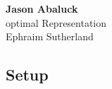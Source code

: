 



\begin{center}
	{\large \bf Jason Abaluck }   \\ \large optimal Representation \\ Ephraim Sutherland
\end{center}

\tableofcontents




\subsection*{Setup}


